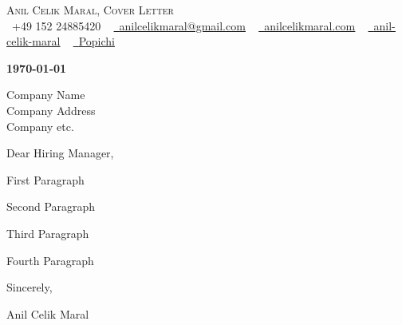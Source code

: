 \documentclass[11pt,a4paper]{article}
\begin{document}
\begin{center}
    {\Huge \scshape Anil Celik Maral, Cover Letter} \\ \vspace{1pt}
    \small \raisebox{-0.1\height}\faPhone\ +49 152 24885420 ~ \href{mailto:anilcelikmaral@gmail.com}{\raisebox{-0.2\height}\faEnvelope\  \underline{anilcelikmaral@gmail.com}} ~ 
    \href{https://anilcelikmaral.com/}{\raisebox{-0.2\height}\faGlobe\ \underline{anilcelikmaral.com}}  ~
    \href{https://www.linkedin.com/in/anil-celik-maral/}{\raisebox{-0.2\height}\faLinkedin\ \underline{anil-celik-maral}}  ~
    \href{https://github.com/Popichi}{\raisebox{-0.2\height}\faGithub\ \underline{Popichi}}
\end{center}

\vspace{10pt}

\begin{flushleft}
\textbf{\today}
\end{flushleft}

\begin{flushleft}
Company Name\\
Company Address\\
Company etc.\\
\end{flushleft}

\vspace{-15pt}

\begin{flushleft}
Dear Hiring Manager,
\end{flushleft}

\begin{flushleft}
First Paragraph
\end{flushleft}

\begin{flushleft}
Second Paragraph
\end{flushleft}

\begin{flushleft}
Third Paragraph
\end{flushleft}

\begin{flushleft}
Fourth Paragraph
\end{flushleft}

\begin{flushleft}
Sincerely,
\end{flushleft}

\begin{flushleft}
Anil Celik Maral
\end{flushleft}
\end{document}
